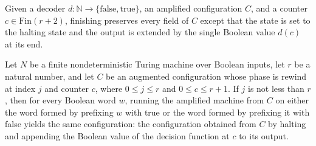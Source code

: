 \begin{definition}
\label{Randomized.Amplify.finish}
\leanok
{}
Given a decoder $d:\mathbb{N}\to\{\mathrm{false},\mathrm{true}\}$, an amplified
configuration $C$, and a counter $c\in\text{Fin}(r+2)$, finishing preserves every field
of $C$ except that the state is set to the halting state and the output is extended by
the single Boolean value $d(c)$ at its end.
\end{definition}

\begin{theorem}
\label{Randomized.Amplify.rewind_last}
\leanok
{}
Let $N$ be a finite nondeterministic Turing machine over Boolean inputs, let $r$ be a
natural number, and let $C$ be an augmented configuration whose phase is rewind at index
$j$ and counter $c$, where $0\le j\le r$ and $0\le c\le r+1$. If $j$ is not less than
$r$, then for every Boolean word $w$, running the amplified machine from $C$ on either
the word formed by prefixing $w$ with true or the word formed by prefixing it with false
yields the same configuration: the configuration obtained from $C$ by halting and
appending the Boolean value of the decision function at $c$ to its output.
\end{theorem}
